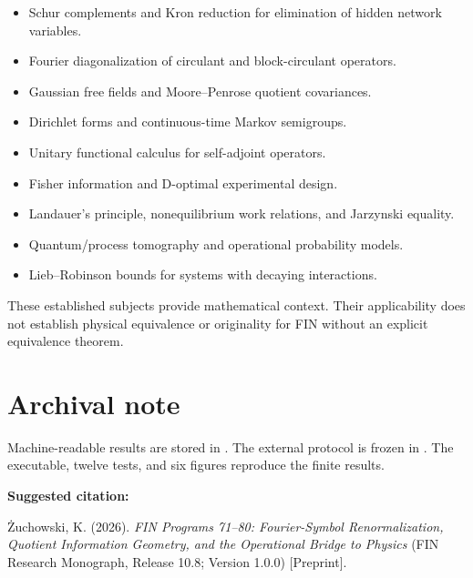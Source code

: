 \documentclass[11pt,a4paper,openany]{report}
\begin{document}
\begin{itemize}
\item 
Schur complements and Kron reduction for elimination of hidden network variables.

\item 
Fourier diagonalization of circulant and block-circulant operators.

\item 
Gaussian free fields and Moore--Penrose quotient covariances.

\item 
Dirichlet forms and continuous-time Markov semigroups.

\item 
Unitary functional calculus for self-adjoint operators.

\item 
Fisher information and D-optimal experimental design.

\item 
Landauer's principle, nonequilibrium work relations, and Jarzynski equality.

\item 
Quantum/\allowbreak{}process tomography and operational probability models.

\item 
Lieb--Robinson bounds for systems with decaying interactions.

\end{itemize}

These established subjects provide mathematical context. Their applicability does not establish physical equivalence or originality for FIN without an explicit equivalence theorem.


\clearpage
\chapter*{Archival note}
Machine-readable results are stored in
. The external
protocol is frozen in
. The executable,
twelve tests, and six figures reproduce the finite results.

\medskip
\noindent\textbf{Suggested citation:}

\.Zuchowski, K. (2026). \emph{FIN Programs 71--80: Fourier-Symbol
Renormalization, Quotient Information Geometry, and the Operational Bridge to
Physics} (FIN Research Monograph, Release 10.8; Version 1.0.0) [Preprint].
\end{document}
